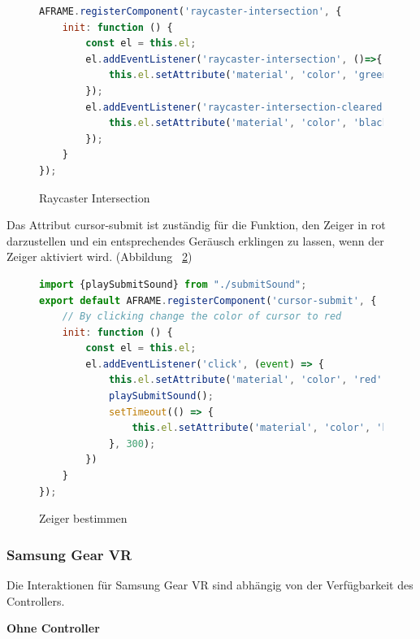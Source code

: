 \begin{figure}[ht]
\vspace*{1em}
\centering
\caption[Raycaster Intersection]{Raycaster Intersection}
\begin{lstlisting}[language=JavaScript, style=htmlcssjs]
AFRAME.registerComponent('raycaster-intersection', {
    init: function () {
        const el = this.el;
        el.addEventListener('raycaster-intersection', ()=>{
            this.el.setAttribute('material', 'color', 'green');
        });
        el.addEventListener('raycaster-intersection-cleared', ()=>{
            this.el.setAttribute('material', 'color', 'black');
        });
    }
});
\end{lstlisting}
\label{fig:raycasterIntersection} 
\end{figure}
  
  Das Attribut {\selectfont cursor-submit} ist zuständig für die Funktion, den Zeiger in rot darzustellen und ein entsprechendes Geräusch erklingen zu lassen, wenn der Zeiger aktiviert wird. (Abbildung ~\ref{fig:cursorSubmit})
  
\begin{figure}[ht]
\vspace*{1em}
\centering
\caption[Zeiger bestimmen]{Zeiger bestimmen}
\begin{lstlisting}[language=JavaScript, style=htmlcssjs]
import {playSubmitSound} from "./submitSound";
export default AFRAME.registerComponent('cursor-submit', {
    // By clicking change the color of cursor to red
    init: function () {
        const el = this.el;
        el.addEventListener('click', (event) => {
            this.el.setAttribute('material', 'color', 'red');
            playSubmitSound();
            setTimeout(() => {
                this.el.setAttribute('material', 'color', 'black');
            }, 300);
        })
    }
});
\end{lstlisting}
\label{fig:cursorSubmit} 
\end{figure}
  
  \subsubsection{Samsung Gear VR}
  Die Interaktionen für Samsung Gear VR sind abhängig von der Verfügbarkeit des Controllers.
  
  \vspace{1em}
  \noindent
  \textbf{Ohne Controller}
  \vspace{1em}
  
